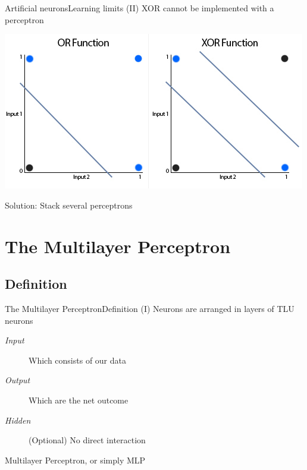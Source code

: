 \documentclass[10pt,compress]{beamer} %
\begin{document}
\begin{frame}{Artificial neurons}{Learning limits (II)}
	XOR cannot be implemented with a perceptron
	\begin{center}
	\includegraphics[width=0.7\linewidth]{figs/xor.jpg}
	\end{center}
	Solution: Stack several perceptrons 
\end{frame}

\section{The Multilayer Perceptron}
\subsection{Definition}

\begin{frame}{The Multilayer Perceptron}{Definition (I)}
	Neurons are arranged in \alert{layers} of TLU neurons

	\begin{description}
	\item[\textit{Input}] Which consists of our data
	\item[\textit{Output}] Which are the net outcome
	\item[\textit{Hidden}] (Optional) No direct interaction
	\end{description}
	Multilayer Perceptron, or simply \alert{MLP}
	\bigskip

        
\end{frame}
\end{document}
